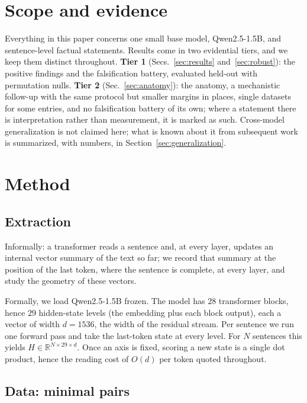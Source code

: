 \documentclass[11pt]{article}
\begin{document}
\section{Scope and evidence}
\label{sec:scope}

Everything in this paper concerns one small base model, Qwen2.5-1.5B, and
sentence-level factual statements. Results come in two evidential tiers, and
we keep them distinct throughout. \textbf{Tier 1} (Secs.~\ref{sec:results}
and~\ref{sec:robust}): the positive findings and the falsification battery,
evaluated held-out with permutation nulls. \textbf{Tier 2}
(Sec.~\ref{sec:anatomy}): the anatomy, a mechanistic follow-up with the same
protocol but smaller margins in places, single datasets for some entries, and
no falsification battery of its own; where a statement there is
interpretation rather than measurement, it is marked as such. Cross-model
generalization is not claimed here; what is known about it from subsequent
work is summarized, with numbers, in Section~\ref{sec:generalization}.

\section{Method}
\label{sec:method}

\subsection{Extraction}
\label{sec:extraction}

Informally: a transformer reads a sentence and, at every layer, updates an
internal vector summary of the text so far; we record that summary at the
position of the last token, where the sentence is complete, at every layer,
and study the geometry of these vectors.

Formally, we load Qwen2.5-1.5B frozen. The model has $28$ transformer blocks,
hence $29$ hidden-state levels (the embedding plus each block output), each a
vector of width $d = 1536$, the width of the residual stream. Per sentence we
run one forward pass and take the last-token state at every level. For $N$
sentences this yields $H \in \mathbb{R}^{N \times 29 \times d}$. Once an axis
is fixed, scoring a new state is a single dot product, hence the reading cost
of $O(d)$ per token quoted throughout.

\subsection{Data: minimal pairs}
\label{sec:data}
\end{document}
